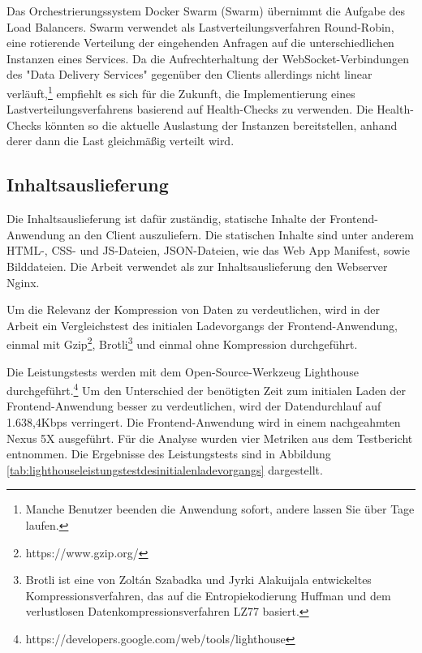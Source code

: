 Das Orchestrierungssystem Docker Swarm (Swarm) übernimmt die Aufgabe des Load Balancers. Swarm verwendet
als Lastverteilungsverfahren Round-Robin, eine rotierende Verteilung der eingehenden Anfragen auf
die unterschiedlichen Instanzen eines Services.\cite{CloudflareRoundRobinDNS}
Da die Aufrechterhaltung der WebSocket-Verbindungen des "Data Delivery Services" gegenüber
den Clients allerdings nicht linear verläuft,\footnote{Manche Benutzer beenden die Anwendung sofort, andere lassen Sie über Tage laufen.}
empfiehlt es sich für die Zukunft, die Implementierung eines Lastverteilungsverfahrens
basierend auf Health-Checks zu verwenden. Die Health-Checks könnten so die aktuelle
Auslastung der Instanzen bereitstellen, anhand derer dann die Last gleichmäßig verteilt wird.

\subsection{Inhaltsauslieferung}
\label{subsec:inhaltsauslieferung}
Die Inhaltsauslieferung ist dafür zuständig, statische Inhalte der Frontend-Anwendung
an den Client auszuliefern. Die statischen Inhalte sind unter anderem
HTML-, CSS- und JS-Dateien, JSON-Dateien, wie das Web App Manifest, sowie Bilddateien.
Die Arbeit verwendet als zur Inhaltsauslieferung den Webserver Nginx.

Um die Relevanz der Kompression von Daten zu verdeutlichen, wird in der Arbeit ein
Vergleichstest des initialen Ladevorgangs der Frontend-Anwendung,
einmal mit Gzip\footnote{https://www.gzip.org/}, Brotli\footnote{Brotli ist eine von Zoltán Szabadka
und Jyrki Alakuijala entwickeltes Kompressionsverfahren,
das auf die Entropiekodierung Huffman und dem verlustlosen
Datenkompressionsverfahren LZ77 basiert.\cite{BrotliGoogleOpenSourceBlog}} und einmal ohne Kompression durchgeführt. 

Die Leistungstests werden mit dem Open-Source-Werkzeug Lighthouse durchgeführt.\footnote{https://developers.google.com/web/tools/lighthouse}
Um den Unterschied der benötigten Zeit zum initialen Laden der Frontend-Anwendung
besser zu verdeutlichen, wird der Datendurchlauf auf \mbox{1.638,4Kbps} verringert.
Die Frontend-Anwendung wird in einem nachgeahmten Nexus 5X ausgeführt.
Für die Analyse wurden vier Metriken aus dem Testbericht entnommen.
Die Ergebnisse des Leistungstests sind in Abbildung \ref{tab:lighthouseleistungstestdesinitialenladevorgangs}
dargestellt.

